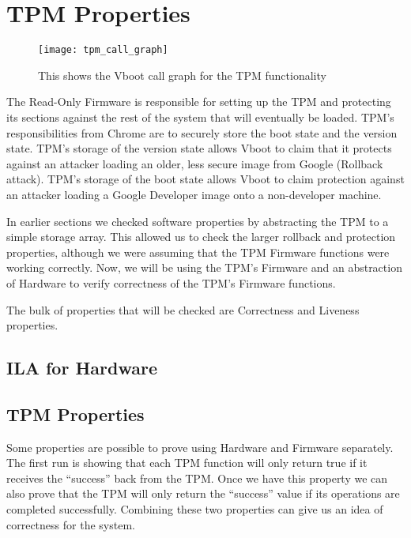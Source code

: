 \section{TPM Properties}

\begin{figure}[!htbp]
  \centering
  \texttt{[image: tpm\_call\_graph]}
  \caption[TPM Call Graph]{This shows the Vboot call graph for the TPM functionality}\label{fig:tpm_call_graph}
\end{figure}

The Read-Only Firmware is responsible for setting up the TPM and protecting its
sections against the rest of the system that will eventually be loaded.
TPM's responsibilities from Chrome are to securely store the boot state and the
version state.
TPM's storage of the version state allows Vboot to claim that it protects against 
an attacker loading an older, less secure image from Google (Rollback attack).
TPM's storage of the boot state allows Vboot to claim protection against an attacker loading a Google Developer image onto a non-developer machine.

In earlier sections we checked software properties by abstracting the TPM to a simple storage array. 
This allowed us to check the larger rollback and protection properties, although we were assuming that the TPM Firmware functions were working correctly.
Now, we will be using the TPM's Firmware and an abstraction of Hardware to verify correctness of the TPM's Firmware functions.

The bulk of properties that will be checked are Correctness and Liveness properties. 


\subsection{ILA for Hardware}   

\subsection{TPM Properties}   

Some properties are possible to prove using Hardware and Firmware separately.
The first run is showing that each TPM function will only return true if it receives the ``success'' back from the TPM\@.
Once we have this property we can also prove that the TPM will only return the ``success'' value if its operations are completed successfully. 
Combining these two properties can give us an idea of correctness for the system.

